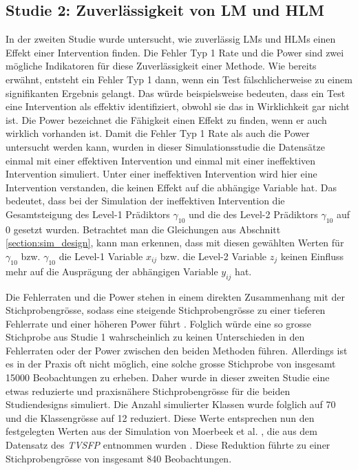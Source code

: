 \documentclass[12pt]{article}\usepackage[]{graphicx}\usepackage[]{color}
\begin{document}
\subsection{Studie 2: Zuverlässigkeit von LM und HLM}
In der zweiten Studie wurde untersucht, wie zuverlässig LMs und HLMs einen Effekt einer Intervention finden. Die Fehler Typ 1 Rate und die Power sind zwei mögliche Indikatoren für diese Zuverlässigkeit einer Methode. Wie bereits erwähnt, entsteht ein Fehler Typ 1 dann, wenn ein Test fälschlicherweise zu einem signifikanten Ergebnis gelangt. Das würde beispielsweise bedeuten, dass ein Test eine Intervention als effektiv identifiziert, obwohl sie das in Wirklichkeit gar nicht ist. Die Power bezeichnet die Fähigkeit einen Effekt zu finden, wenn er auch wirklich vorhanden ist. Damit die Fehler Typ 1 Rate als auch die Power untersucht werden kann, wurden in dieser Simulationsstudie die Datensätze einmal mit einer effektiven Intervention und einmal mit einer ineffektiven Intervention simuliert. Unter einer ineffektiven Intervention wird hier eine Intervention verstanden, die keinen Effekt auf die abhängige Variable hat. Das bedeutet, dass bei der Simulation der ineffektiven Intervention die Gesamtsteigung des Level-1 Prädiktors $\gamma_{10}$ und die des Level-2 Prädiktors $\gamma_{10}$ auf 0 gesetzt wurden. Betrachtet man die Gleichungen aus Abschnitt \ref{section:sim_design}, kann man erkennen, dass mit diesen gewählten Werten für $\gamma_{10}$ bzw. $\gamma_{10}$ die Level-1 Variable $x_{ij}$ bzw. die Level-2 Variable $z_{j}$ keinen Einfluss mehr auf die Ausprägung der abhängigen Variable $y_{ij}$ hat.

Die Fehlerraten und die Power stehen in einem direkten Zusammenhang mit der Stichprobengrösse, sodass eine steigende Stichprobengrösse zu einer tieferen Fehlerrate und einer höheren Power führt \citep{snijders2005samplesizepower}. Folglich würde eine so grosse Stichprobe aus Studie 1 wahrscheinlich zu keinen Unterschieden in den Fehlerraten oder der Power zwischen den beiden Methoden führen. Allerdings ist es in der Praxis oft nicht möglich, eine solche grosse Stichprobe von insgesamt 15000 Beobachtungen zu erheben. Daher wurde in dieser zweiten Studie eine etwas reduzierte und praxisnähere Stichprobengrösse für die beiden Studiendesigns simuliert. Die Anzahl simulierter Klassen wurde folglich auf 70 und die Klassengrösse auf 12 reduziert. Diese Werte entsprechen nun den festgelegten Werten aus der Simulation von Moerbeek et al. \citeyearpar{MOERBEEK2003341}, die aus dem Datensatz des \textit{TVSFP} entnommen wurden \citep{FLAY1995smoking}. Diese Reduktion führte zu einer Stichprobengrösse von insgesamt 840 Beobachtungen. 
\end{document}
